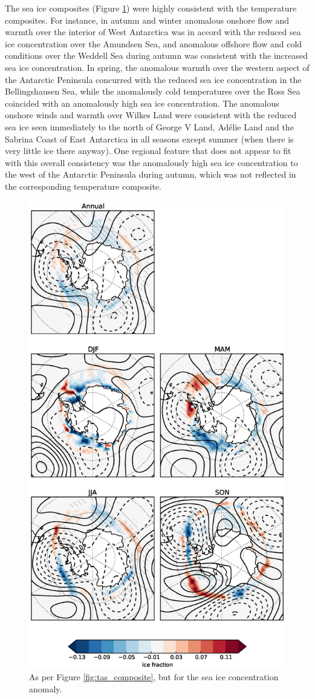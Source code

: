The sea ice composites (Figure \ref{fig:sic_composite}) were highly consistent with the temperature composites. For instance, in autumn and winter anomalous onshore flow and warmth over the interior of West Antarctica was in accord with the reduced sea ice concentration over the Amundsen Sea, and anomalous offshore flow and cold conditions over the Weddell Sea during autumn was consistent with the increased sea ice concentration. In spring, the anomalous warmth over the western aspect of the Antarctic Peninsula concurred with the reduced sea ice concentration in the Bellingshausen Sea, while the anomalously cold temperatures over the Ross Sea coincided with an anomalously high sea ice concentration. The anomalous onshore winds and warmth over Wilkes Land were consistent with the reduced sea ice seen immediately to the north of George V Land, Ad{\'e}lie Land and the Sabrina Coast of East Antarctica in all seasons except summer (when there is very little ice there anyway). One regional feature that does not appear to fit with this overall consistency was the anomalously high sea ice concentration to the west of the Antarctic Peninsula during autumn, which was not reflected in the corresponding temperature composite.
 
\begin{figure}
\begin{center}
\includegraphics[width=0.63\columnwidth]{figures/zonalwaves/sic-composite_pwigt90pct_ERAInterim_500hPa_030day-runmean-anom-wrt-all_native-shextropics15.eps}
\caption[As per Figure \ref{fig:tas_composite}, but for the sea ice concentration anomaly]{\label{fig:sic_composite}
As per Figure \ref{fig:tas_composite}, but for the sea ice concentration anomaly.}
\end{center}
\end{figure}    
 


